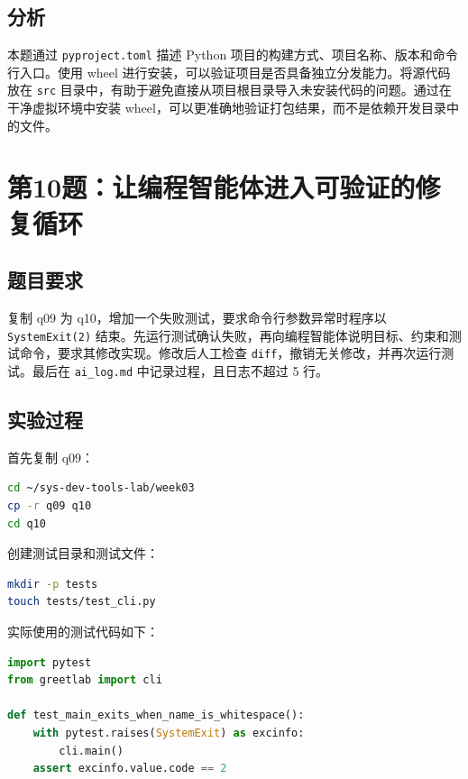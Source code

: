 \documentclass[UTF8,a4paper,12pt]{ctexart}
\begin{document}
\subsection*{分析}

本题通过 \verb|pyproject.toml| 描述 Python 项目的构建方式、项目名称、版本和命令行入口。使用 wheel 进行安装，可以验证项目是否具备独立分发能力。将源代码放在 \verb|src| 目录中，有助于避免直接从项目根目录导入未安装代码的问题。通过在干净虚拟环境中安装 wheel，可以更准确地验证打包结果，而不是依赖开发目录中的文件。

\section{第10题：让编程智能体进入可验证的修复循环}

\subsection*{题目要求}

复制 q09 为 q10，增加一个失败测试，要求命令行参数异常时程序以 \verb|SystemExit(2)| 结束。先运行测试确认失败，再向编程智能体说明目标、约束和测试命令，要求其修改实现。修改后人工检查 \verb|diff|，撤销无关修改，并再次运行测试。最后在 \verb|ai_log.md| 中记录过程，且日志不超过 5 行。

\subsection*{实验过程}

首先复制 q09：

\begin{lstlisting}[language=bash]
cd ~/sys-dev-tools-lab/week03
cp -r q09 q10
cd q10
\end{lstlisting}

创建测试目录和测试文件：

\begin{lstlisting}[language=bash]
mkdir -p tests
touch tests/test_cli.py
\end{lstlisting}

实际使用的测试代码如下：

\begin{lstlisting}[language=Python]
import pytest
from greetlab import cli

def test_main_exits_when_name_is_whitespace():
    with pytest.raises(SystemExit) as excinfo:
        cli.main()
    assert excinfo.value.code == 2
\end{lstlisting}
\end{document}
